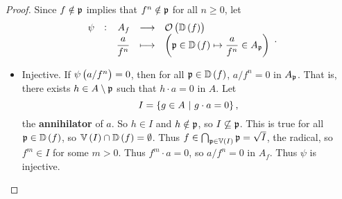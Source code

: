 \begin{proof}
Since $ f \notin \mathfrak{p} $ implies that $ f^n \notin \mathfrak{p} $ for all $ n \ge 0 $, let
$$ \function[\psi]{A_f}{\OOO\br{\DD\br{f}}}{\dfrac{a}{f^n}}{\br{\ppp \in \DD\br{f} \mapsto \dfrac{a}{f^n} \in A_\ppp}}. $$
\begin{itemize}
\item Injective. If $ \psi\br{a / f^n} = 0 $, then for all $ \ppp \in \DD\br{f} $, $ a / f^n = 0 $ in $ A_{\mathfrak{p}} $. That is, there exists $ h \in A \setminus \mathfrak{p} $ such that $ h \cdot a = 0 $ in $ A $. Let
$$ I = \cbr{g \in A \st g \cdot a = 0}, $$
the \textbf{annihilator} of $ a $. So $ h \in I $ and $ h \notin \mathfrak{p} $, so $ I \not\subseteq \mathfrak{p} $. This is true for all $ \ppp \in \DD\br{f} $, so $ \VV\br{I} \cap \DD\br{f} = \emptyset $. Thus $ f \in \bigcap_{\ppp \in \VV\br{I}} \ppp = \sqrt{I} $, the radical, so $ f^m \in I $ for some $ m > 0 $. Thus $ f^m \cdot a = 0 $, so $ a / f^n = 0 $ in $ A_f $. Thus $ \psi $ is injective.



\end{itemize}
\end{proof}
